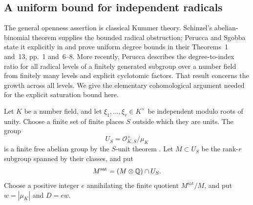 \subsection{A uniform bound for independent radicals}
The general openness assertion is classical Kummer theory. Schinzel's
abelian-binomial theorem supplies the bounded radical obstruction;
Perucca and Sgobba state it explicitly in
\cite[Theorem~15, p.~7]{PeruccaSgobba} and prove uniform degree bounds
in their Theorems~1 and~13, pp.~1 and~6--8. More recently, Perucca
\cite[Theorem~26, pp.~13--14]{Perucca2026} describes the degree-to-index
ratio for all radical levels of a finitely generated subgroup over a
number field from finitely many levels and explicit cyclotomic factors.
That result concerns the growth across all levels. We give the elementary
cohomological argument needed for the explicit saturation bound here.

Let $K$ be a number field, and let $\xi_1,\ldots,\xi_r\in K^\times$
be independent modulo roots of unity. Choose a finite set of finite
places $S$ outside which they are units. The group
\[
 U_S=\mathcal O_{K,S}^{\times}/\mu_K
\]
is a finite free abelian group by the $S$-unit theorem
\cite[Theorem~5.11, p.~90]{MilneANT}. Let $M\subset U_S$ be the
rank-$r$ subgroup spanned by their classes, and put
\[
 M^{\mathrm{sat}}=(M\otimes\mathbb Q)\cap U_S.
\]
Choose a positive integer $e$ annihilating the finite quotient
$M^{\mathrm{sat}}/M$, and put $w=|\mu_K|$ and $D=ew$.

